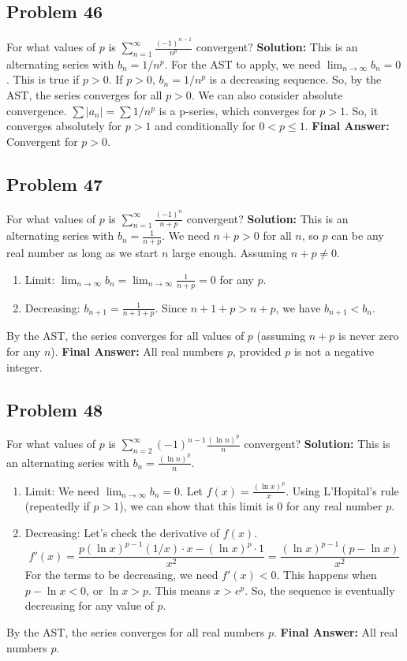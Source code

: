 \documentclass{article}
\begin{document}
\subsection*{Problem 46}
For what values of $p$ is $\sum_{n=1}^{\infty} \frac{(-1)^{n-1}}{n^p}$ convergent?
\textbf{Solution:} This is an alternating series with $b_n = 1/n^p$.
For the AST to apply, we need $\lim_{n \to \infty} b_n = 0$. This is true if $p>0$.
If $p>0$, $b_n = 1/n^p$ is a decreasing sequence.
So, by the AST, the series converges for all $p>0$.
We can also consider absolute convergence. $\sum |a_n| = \sum 1/n^p$ is a p-series, which converges for $p>1$.
So, it converges absolutely for $p>1$ and conditionally for $0 < p \le 1$.
\textbf{Final Answer:} Convergent for $p>0$.

\subsection*{Problem 47}
For what values of $p$ is $\sum_{n=1}^{\infty} \frac{(-1)^n}{n+p}$ convergent?
\textbf{Solution:} This is an alternating series with $b_n = \frac{1}{n+p}$. We need $n+p>0$ for all $n$, so $p$ can be any real number as long as we start $n$ large enough. Assuming $n+p \neq 0$.
\begin{enumerate}
    \item Limit: $\lim_{n \to \infty} b_n = \lim_{n \to \infty} \frac{1}{n+p} = 0$ for any $p$.
    \item Decreasing: $b_{n+1} = \frac{1}{n+1+p}$. Since $n+1+p > n+p$, we have $b_{n+1} < b_n$.
\end{enumerate}
By the AST, the series converges for all values of $p$ (assuming $n+p$ is never zero for any $n$).
\textbf{Final Answer:} All real numbers $p$, provided $p$ is not a negative integer.

\subsection*{Problem 48}
For what values of $p$ is $\sum_{n=2}^{\infty} (-1)^{n-1} \frac{(\ln n)^p}{n}$ convergent?
\textbf{Solution:} This is an alternating series with $b_n = \frac{(\ln n)^p}{n}$.
\begin{enumerate}
    \item Limit: We need $\lim_{n \to \infty} b_n = 0$. Let $f(x) = \frac{(\ln x)^p}{x}$. Using L'Hopital's rule (repeatedly if $p>1$), we can show that this limit is 0 for any real number $p$.
    \item Decreasing: Let's check the derivative of $f(x)$.
    \[ f'(x) = \frac{p(\ln x)^{p-1}(1/x) \cdot x - (\ln x)^p \cdot 1}{x^2} = \frac{(\ln x)^{p-1}(p-\ln x)}{x^2} \]
    For the terms to be decreasing, we need $f'(x) < 0$. This happens when $p - \ln x < 0$, or $\ln x > p$. This means $x > e^p$. So, the sequence is eventually decreasing for any value of $p$.
\end{enumerate}
By the AST, the series converges for all real numbers $p$.
\textbf{Final Answer:} All real numbers $p$.
\end{document}
